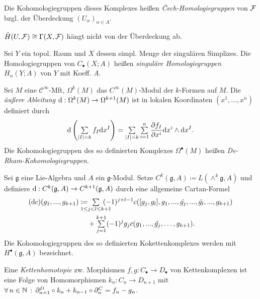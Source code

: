 \documentclass{cheat-sheet}
\newcommand{\nspace}[1]{\foreach \i in {1,...,#1}{ \! }} %
\newcommand{\CC}[1]{{#1}_{\bullet}} %
\newcommand{\Lg}{\mathfrak{g}} %
\newcommand{\Cont}{\mathcal{C}} %
\begin{document}
\begin{defn}
  Die Kohomologiegruppen dieses Komplexes heißen \emph{Čech-Homologiegruppen} von $\mathcal{F}$ bzgl. der Überdeckung $(U_\alpha)_{\alpha \in A}$.
\end{defn}

\begin{bem}
  $\check{H}(U, \mathcal{F}) \cong \Gamma(X, \mathcal{F})$ hängt nicht von der Überdeckung ab.
\end{bem}

\begin{defn}
  Sei $Y$ ein topol. Raum und $X$ dessen simpl. Menge der singulären Simplizes.
  Die Homologiegruppen von $\CC{C}(X; A)$ heißen \emph{singuläre Homologiegruppen} $H_n(Y; A)$ von $Y$ mit Koeff. $A$.
\end{defn}


\begin{defn}
  Sei $M$ eine $\Cont^\infty$-Mft, $\Omega^k(M)$ das $C^\infty(M)$-Modul der $k$-Formen auf $M$. Die \emph{äußere Ableitung} $\mathrm{d} : \Omega^k(M) \to \Omega^{k+1}(M)$ ist in lokalen Koordinaten $(x^1, \ldots, x^n)$ definiert durch
  \[ \d \left( \sum_{\abs{I} = k} f_I \d x^I \right) = \sum_{\abs{I} = k} \sum_{i=1}^n \frac{\partial f_I}{\partial x^i} \d x^i \wedge \d x^I. \]
  Die Kohomologiegruppen des so definierten Komplexes $\Omega^\bullet(M)$ heißen \emph{De-Rham-Kohomologiegruppen}.
\end{defn}


\begin{defn}
  Sei $\Lg$ eine Lie-Algebra und $A$ ein $\Lg$-Modul. Setze $C^k(\Lg, A) \coloneqq L(\wedge^k \Lg, A)$ und definiere $\d : C^k(\Lg, A) \to C^{k+1}(\Lg, A)$ durch eine allgemeine Cartan-Formel
  \begin{align*}
    (\d c)(g_1, \nldots, g_{k+1}) \coloneqq & \nspace{7} \sum_{1 \leq j < l \leq k+1} \nspace{7} (-1)^{j+l-1} c([g_j, g_l], g_1, \nldots, \hat{g_j}, \nldots, \hat{g_l}, \nldots, g_{k+1}) \\
    & + \sum_{j=1}^{k+1} (-1)^j g_j c(g_1, \nldots, \hat{g_j}, \ldots, g_{k+1}).
  \end{align*}
  Die Kohomologiegruppen des so definierten Kokettenkomplexes werden mit $H^\bullet(\Lg, A)$ bezeichnet.
\end{defn}

\begin{defn}
  Eine \emph{Kettenhomotopie} zw. Morphismen $f, g : \CC{C} \to \CC{D}$ von Kettenkomplexen ist eine Folge von Homomorphismen $k_n : C_n \to D_{n+1}$ mit
  $\forall \, {n \in \mathbb{N}} \,:\, \partial^D_{n+1} \circ k_n + k_{n-1} \circ \partial^C_n = f_n - g_n$.
\end{defn}
\end{document}
